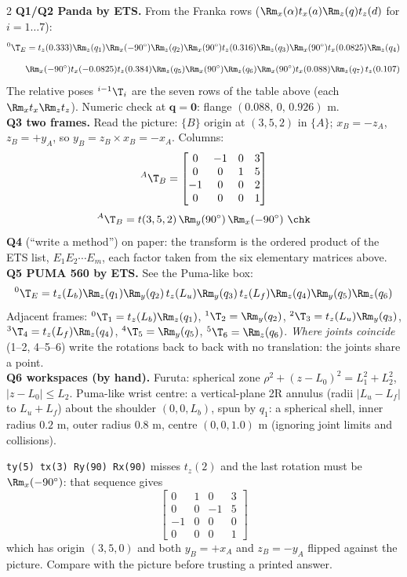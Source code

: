 \begin{multicols}{2}
\textbf{Q1/Q2 Panda by ETS.} From the Franka rows ($\Rm_x(\alpha)t_x(a)\Rm_z(q)t_z(d)$ for $i=1\dots7$):
\[{}^0\T_E=t_z(0.333)\Rm_z(q_1)\Rm_x(-90^\circ)\Rm_z(q_2)\Rm_x(90^\circ)t_z(0.316)\Rm_z(q_3)\Rm_x(90^\circ)t_x(0.0825)\Rm_z(q_4)\]
\[\qquad\Rm_x(-90^\circ)t_x(-0.0825)t_z(0.384)\Rm_z(q_5)\Rm_x(90^\circ)\Rm_z(q_6)\Rm_x(90^\circ)t_x(0.088)\Rm_z(q_7)\,t_z(0.107)\]
The relative poses ${}^{i-1}\T_i$ are the seven rows of the table above (each $\Rm_x t_x \Rm_z t_z$). Numeric check at $\mathbf q=\mathbf 0$: flange $(0.088,\,0,\,0.926)$ m. \chk\\[3pt]
\textbf{Q3 two frames.} Read the picture: $\{B\}$ origin at $(3,5,2)$ in $\{A\}$; $x_B=-z_A$, $z_B=+y_A$, so $y_B=z_B\times x_B=-x_A$. Columns:
\[{}^A\T_B=\begin{bmatrix}0&-1&0&3\\0&0&1&5\\-1&0&0&2\\0&0&0&1\end{bmatrix}\]
\[{}^A\T_B=t(3,5,2)\,\Rm_y(90^\circ)\,\Rm_x(-90^\circ)\ \chk\]
\textbf{Q4} (``write a method'') on paper: the transform is the ordered product of the ETS list, $E_1E_2\cdots E_m$, each factor taken from the six elementary matrices above.\\[3pt]
\textbf{Q5 PUMA 560 by ETS.} See the Puma-like box:
\[{}^0\T_E=t_z(L_b)\Rm_z(q_1)\Rm_y(q_2)\,t_z(L_u)\Rm_y(q_3)\,t_z(L_f)\Rm_z(q_4)\Rm_y(q_5)\Rm_z(q_6)\]
Adjacent frames: ${}^0\T_1=t_z(L_b)\Rm_z(q_1)$, ${}^1\T_2=\Rm_y(q_2)$, ${}^2\T_3=t_z(L_u)\Rm_y(q_3)$, ${}^3\T_4=t_z(L_f)\Rm_z(q_4)$, ${}^4\T_5=\Rm_y(q_5)$, ${}^5\T_6=\Rm_z(q_6)$. \emph{Where joints coincide} (1--2, 4--5--6) write the rotations back to back with no translation: the joints share a point. \chk\\[3pt]
\textbf{Q6 workspaces (by hand).} Furuta: spherical zone $\rho^2+(z-L_0)^2=L_1^2+L_2^2$, $|z-L_0|\le L_2$. Puma-like wrist centre: a vertical-plane 2R annulus (radii $|L_u-L_f|$ to $L_u+L_f$) about the shoulder $(0,0,L_b)$, spun by $q_1$: a spherical shell, inner radius $0.2$ m, outer radius $0.8$ m, centre $(0,0,1.0)$ m (ignoring joint limits and collisions). \chk
\begin{slideerr}
\texttt{ty(5) tx(3) Ry(90) Rx(90)} misses $t_z(2)$ and the last rotation must be $\Rm_x(-90^\circ)$: that sequence gives
\[\begin{bmatrix}0&1&0&3\\0&0&-1&5\\-1&0&0&0\\0&0&0&1\end{bmatrix}\]
which has origin $(3,5,0)$ and both $y_B=+x_A$ and $z_B=-y_A$ flipped against the picture. Compare with the picture before trusting a printed answer. \chk
\end{slideerr}


\end{multicols}
